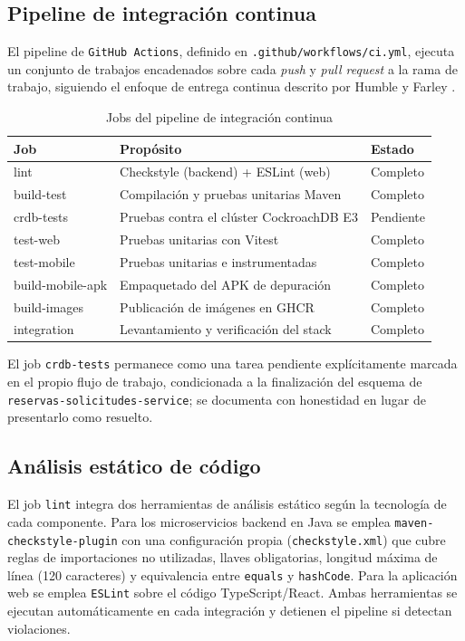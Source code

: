 \subsection{Pipeline de integración continua}

El pipeline de \texttt{GitHub Actions}, definido en
\texttt{.github/workflows/ci.yml}, ejecuta un conjunto de trabajos
encadenados sobre cada \emph{push} y \emph{pull request} a la rama de
trabajo, siguiendo el enfoque de entrega continua descrito por
Humble y Farley \cite{humble2010continuous}.

\begin{table}[htbp]
\centering
\caption{Jobs del pipeline de integración continua}
\label{tab:jobs-cicd}
\begin{tabular}{lll}
\toprule
Job & Propósito & Estado \\
\midrule
lint & Checkstyle (backend) + ESLint (web) & Completo \\
build-test & Compilación y pruebas unitarias Maven & Completo \\
crdb-tests & Pruebas contra el clúster CockroachDB E3 & Pendiente \\
test-web & Pruebas unitarias con Vitest & Completo \\
test-mobile & Pruebas unitarias e instrumentadas & Completo \\
build-mobile-apk & Empaquetado del APK de depuración & Completo \\
build-images & Publicación de imágenes en GHCR & Completo \\
integration & Levantamiento y verificación del stack & Completo \\
\bottomrule
\end{tabular}
\end{table}

El job \texttt{crdb-tests} permanece como una tarea pendiente
explícitamente marcada en el propio flujo de trabajo, condicionada a la
finalización del esquema de \texttt{reservas-solicitudes-service}; se
documenta con honestidad en lugar de presentarlo como resuelto.

\subsection{Análisis estático de código}

El job \texttt{lint} integra dos herramientas de análisis estático
según la tecnología de cada componente. Para los microservicios backend
en Java se emplea \texttt{maven-checkstyle-plugin} con una configuración
propia (\texttt{checkstyle.xml}) que cubre reglas de importaciones no
utilizadas, llaves obligatorias, longitud máxima de línea (120
caracteres) y equivalencia entre \texttt{equals} y \texttt{hashCode}.
Para la aplicación web se emplea \texttt{ESLint} sobre el código
TypeScript/React. Ambas herramientas se ejecutan automáticamente en
cada integración y detienen el pipeline si detectan violaciones.
